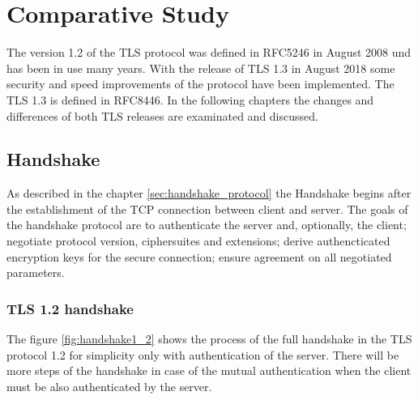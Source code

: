 \chapter{Comparative Study}
\label{chap:comparative_study}

The version 1.2 of the TLS protocol was defined in RFC5246 in August 2008 und has been in use many years. With the release of TLS 1.3 in August 2018 some security and speed improvements of the protocol have been implemented. The TLS 1.3 is defined in RFC8446. In the following chapters the changes and differences of both TLS releases are examinated and discussed.

\section{Handshake}
\label{sec:comparison_handshake}

As described in the chapter \ref{sec:handshake_protocol} the Handshake begins after the establishment of the TCP connection between client and server. The goals of the handshake protocol are to authenticate the server and, optionally, the client; negotiate protocol version, ciphersuites and extensions; derive authencticated encryption keys for the secure connection; ensure agreement on all negotiated parameters. \cite{Hassenstein}

\subsection{TLS 1.2 handshake}
\label{subsec:handshake1_2}

The figure \ref{fig:handshake1_2} shows the process of the full handshake in the TLS protocol 1.2 for simplicity only with authentication of the server. There will be more steps of the handshake in case of the mutual authentication when the client must be also authenticated by the server.

